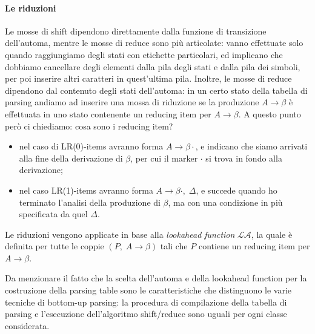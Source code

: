 \documentclass[class=book, crop=false, oneside, 12pt]{standalone}
\begin{document}
\paragraph{Le riduzioni}
Le mosse di shift dipendono direttamente dalla funzione di transizione dell'automa, mentre le mosse di reduce sono più articolate: vanno effettuate solo quando raggiungiamo degli stati con etichette particolari, ed implicano che dobbiamo cancellare degli elementi dalla pila degli stati e dalla pila dei simboli, per poi inserire altri caratteri in quest'ultima pila. Inoltre, le mosse di reduce dipendono dal contenuto degli stati dell'automa: in un certo stato della tabella di parsing andiamo ad inserire una mossa di riduzione se la produzione \(A \to \beta\) è effettuata in uno stato contenente un reducing item per \(A \to \beta\). A questo punto però ci chiediamo: cosa sono i reducing item?
\begin{itemize}
    \item nel caso di LR(0)-items avranno forma \(A \to \beta \cdot\), e indicano che siamo arrivati alla fine della derivazione di \(\beta\), per cui il marker \(\cdot\) si trova in fondo alla derivazione;
    \item nel caso LR(1)-items avranno forma \(A \to \beta \cdot, \; \Delta\), e succede quando ho terminato l'analisi della produzione di \(\beta\),  ma con una condizione in più specificata da quel \(\Delta\).
\end{itemize}
Le riduzioni vengono applicate in base alla \emph{lookahead function} \(\mathcal{LA}\), la quale è definita per tutte le coppie \((P,\; A \to \beta)\) tali che \(P\) contiene un reducing item per \(A \to \beta\).

Da menzionare il fatto che la scelta dell'automa e della lookahead function per la costruzione della parsing table sono le caratteristiche che distinguono le varie tecniche di bottom-up parsing: la procedura di compilazione della tabella di parsing e l'esecuzione dell'algoritmo shift/reduce sono uguali per ogni classe considerata.
\end{document}
